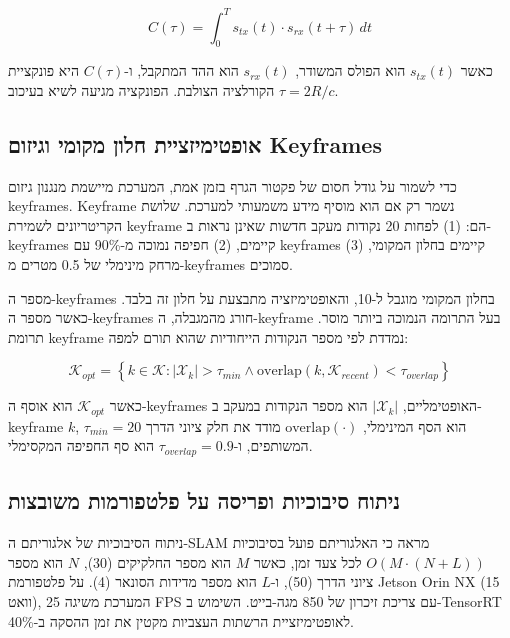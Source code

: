 \begin{equation}
C(\tau) = \int_0^T s_{tx}(t) \cdot s_{rx}(t + \tau) \, dt
\label{eq:ch04_cross_correlation}
\end{equation}

כאשר $s_{tx}(t)$ הוא הפולס המשודר, $s_{rx}(t)$ הוא ההד המתקבל, ו-$C(\tau)$ היא פונקציית הקורלציה הצולבת. הפונקציה מגיעה לשיא בעיכוב $\tau = 2R/c$.

\subsection{אופטימיזציית חלון מקומי וגיזום Keyframes}
\label{sec:ch04_keyframe_culling}

כדי לשמור על גודל חסום של פקטור הגרף בזמן אמת, המערכת מיישמת מנגנון גיזום keyframes. Keyframe נשמר רק אם הוא מוסיף מידע משמעותי למערכת. שלושת הקריטריונים לשמירת keyframe הם: (1) לפחות 20 נקודות מעקב חדשות שאינן נראות ב-keyframes קיימים, (2) חפיפה נמוכה מ-90\% עם keyframes קיימים בחלון המקומי, (3) מרחק מינימלי של 0.5 מטרים מ-keyframes סמוכים.

מספר ה-keyframes בחלון המקומי מוגבל ל-10, והאופטימיזציה מתבצעת על חלון זה בלבד. כאשר מספר ה-keyframes חורג מהמגבלה, ה-keyframe בעל התרומה הנמוכה ביותר מוסר. תרומת keyframe נמדדת לפי מספר הנקודות הייחודיות שהוא תורם למפה:

\begin{equation}
\mathcal{K}_{opt} = \left\{ k \in \mathcal{K} : |\mathcal{X}_k| > \tau_{min} \land \text{overlap}(k, \mathcal{K}_{recent}) < \tau_{overlap} \right\}
\label{eq:ch04_keyframe_culling}
\end{equation}

כאשר $\mathcal{K}_{opt}$ הוא אוסף ה-keyframes האופטימליים, $|\mathcal{X}_k|$ הוא מספר הנקודות במעקב ב-keyframe $k$, $\tau_{min} = 20$ הוא הסף המינימלי, $\text{overlap}(\cdot)$ מודד את חלק ציוני הדרך המשותפים, ו-$\tau_{overlap} = 0.9$ הוא סף החפיפה המקסימלי.

\subsection{ניתוח סיבוכיות ופריסה על פלטפורמות משובצות}
\label{sec:ch04_complexity}

ניתוח הסיבוכיות של אלגוריתם ה-SLAM מראה כי האלגוריתם פועל בסיבוכיות $O(M \cdot (N + L))$ לכל צעד זמן, כאשר $M$ הוא מספר החלקיקים (30), $N$ הוא מספר ציוני הדרך (50), ו-$L$ הוא מספר מדידות הסונאר (4). על פלטפורמת Jetson Orin NX (15 וואט), המערכת משיגה 25 FPS עם צריכת זיכרון של 850 מגה-בייט. השימוש ב-TensorRT לאופטימיזציית הרשתות העצביות מקטין את זמן ההסקה ב-40\%.

